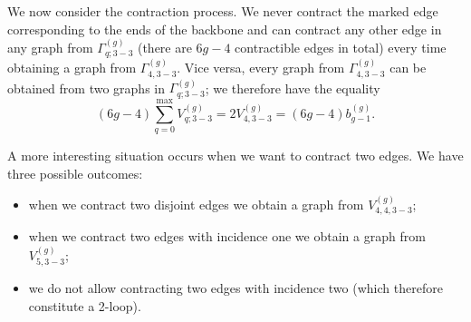 \documentclass[11pt]{article}
\theoremstyle{plain}
\theoremstyle{definition}
\begin{document}
We now consider the contraction process. We never contract the
marked edge corresponding to the ends of the backbone and can contract any other edge in any graph from
$\Gamma^{(g)}_{q;3{-}3}$ (there are $6g-4$ contractible edges in
total) every time obtaining a graph from $\Gamma^{(g)}_{4,3{-}3}$.
Vice versa, every graph from $\Gamma^{(g)}_{4,3{-}3}$ can be
obtained from two graphs in $\Gamma^{(g)}_{q;3{-}3}$; we therefore
have the equality
$$
(6g-4)\sum_{q=0}^{\mathrm{max}}V^{(g)}_{q;3{-}3}=2V^{(g)}_{4,3{-}3}=(6g-4)b^{(g)}_{g-1}.
$$

A more interesting situation occurs when we want to contract two edges. We have three possible outcomes:
\begin{itemize}
\item[1] when we contract two disjoint edges we obtain a graph from $V^{(g)}_{4,4,3{-}3}$;
\item[2] when we contract two edges with incidence one we obtain a graph from $V^{(g)}_{5,3{-}3}$;
\item[3] we do not allow contracting two edges with incidence two (which therefore constitute a 2-loop).
\end{itemize}
\end{document}

